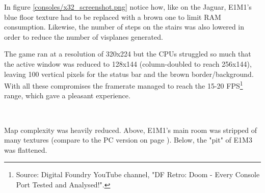 In figure \ref{consoles/x32_screenshot.png} notice how, like on the Jaguar, E1M1's blue floor texture had to be replaced with a brown one to limit RAM consumption. Likewise, the number of steps on the stairs was also lowered in order to reduce the number of visplanes generated.\\
\par
The game ran at a resolution of 320x224 but the CPUs struggled so much that the active window was reduced to 128x144 (column-doubled to reach 256x144), leaving 100 vertical pixels for the status bar and the brown border/background. With all these compromises the framerate managed to reach the 15-20 FPS\footnote{Source: Digital Foundry YouTube channel, "DF Retro: Doom - Every Console Port Tested and Analysed!".} range, which gave a pleasant experience.\\
\par
{}



\\
\par
Map complexity was heavily reduced. Above, E1M1's main room was stripped of many textures (compare to the PC version on page \pageref{complex_scene_plain_light.png}). Below, the "pit" of E1M3 was flattened.\\
\par
{}






